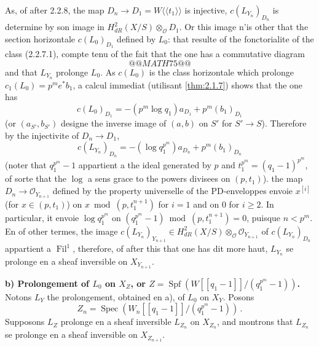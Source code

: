 \documentclass[12pt,a4paper]{article}
\theoremstyle{plain}
\theoremstyle{definition}
\theoremstyle{remark}
\DeclareMathOperator{\Spf}{Spf}
\DeclareMathOperator{\Spec}{Spec}
\DeclareMathOperator{\Fil}{Fil}
\begin{document}
As, of after 2.2.8, the map $D_n \to D_1 = W\langle\langle t_1 \rangle\rangle$ is injective, $c(L_{Y_n})_{D_n}$ is determine by son image in $H_{dR}^2(X/S) \otimes_\mathcal{O} D_1$. Or this image n'is other that the section horizontale $c(L_0)_{D_1}$ defined by $L_0$: that resulte of the fonctorialite of the class (2.2.7.1), compte tenu of the fait that the one has a commutative diagram
\[
@@MATH75@@
\]
and that $L_{Y_n}$ prolonge $L_0$. As $c(L_0)$ is the class horizontale which prolonge $c_1(L_0) = p^me^*b_1$, a calcul immediat (utilisant \ref{thm:2.1.7}) shows that the one has
\[
c(L_0)_{D_1} = -(p^m \log q_1)a_{D_1} + p^m(b_1)_{D_1}
\]
(or $(a_{S'}, b_{S'})$ designe the inverse image of $(a, b)$ on $S'$ for $S' \to S$). Therefore by the injectivite of $D_n \to D_1$,
\[
c(L_{Y_n})_{D_n} = -(\log q_1^{p^m})a_{D_n} + p^m(b_1)_{D_n}
\]
(noter that $q_1^{p^m} - 1$ appartient a the ideal generated by $p$ and $t_1^{p^m} = (q_1-1)^{p^m}$, of sorte that the $\log$ a sens grace to the powers divisees on $(p, t_1)$). the map $D_n \to \mathcal{O}_{Y_{n+1}}$ defined by the property universelle of the PD-enveloppes envoie $x^{[i]}$ (for $x \in (p, t_1)$) on $x \bmod (p, t_1^{n+1})$ for $i = 1$ and on $0$ for $i \geq 2$. In particular, it envoie $\log q_1^{p^m}$ on $(q_1^{p^m} - 1) \bmod (p, t_1^{n+1}) = 0$, puisque $n < p^m$. En of other termes, the image $c(L_{Y_n})_{Y_{n+1}} \in H_{dR}^2(X/S) \otimes_\mathcal{O} \mathcal{O}_{Y_{n+1}}$ of $c(L_{Y_n})_{D_n}$ appartient a $\Fil^1$, therefore, of after this that one has dit more haut, $L_{Y_n}$ se prolonge en a sheaf inversible on $X_{Y_{n+1}}$.

\textbf{b) Prolongement of $L_0$ on $X_Z$, or $Z = \Spf(W[[q_1-1]]/(q_1^{p^m} - 1))$.} Notons $L_{Y}$ the prolongement, obtained en a), of $L_0$ on $X_Y$. Posons
\[
Z_n = \Spec(W_n[[q_1-1]]/(q_1^{p^m} - 1))\,.\]
Supposons $L_Z$ prolonge en a sheaf inversible $L_{Z_n}$ on $X_{Z_n}$, and montrons that $L_{Z_n}$ se prolonge en a sheaf inversible on $X_{Z_{n+1}}$.
\end{document}
